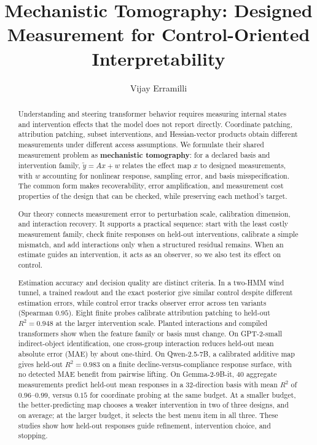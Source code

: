\documentclass[sigconf,10pt,nonacm,balance=false]{acmart}
\title[Mechanistic Tomography]{Mechanistic Tomography: Designed Measurement for Control-Oriented Interpretability}
\author{Vijay Erramilli}
\begin{document}
\begin{abstract}
Understanding and steering transformer behavior requires measuring internal states and intervention effects that the model does not report directly. Coordinate patching, attribution patching, subset interventions, and Hessian-vector products obtain different measurements under different access assumptions. We formulate their shared measurement problem as \textbf{mechanistic tomography}: for a declared basis and intervention family, $\widetilde y=Ax+w$ relates the effect map $x$ to designed measurements, with $w$ accounting for nonlinear response, sampling error, and basis misspecification. The common form makes recoverability, error amplification, and measurement cost properties of the design that can be checked, while preserving each method's target.

Our theory connects measurement error to perturbation scale, calibration dimension, and interaction recovery. It supports a practical sequence: start with the least costly measurement family, check finite responses on held-out interventions, calibrate a simple mismatch, and add interactions only when a structured residual remains. When an estimate guides an intervention, it acts as an observer, so we also test its effect on control.

Estimation accuracy and decision quality are distinct criteria. In a two-HMM wind tunnel, a trained readout and the exact posterior give similar control despite different estimation errors, while control error tracks observer error across ten variants (Spearman $0.95$). Eight finite probes calibrate attribution patching to held-out $R^2=0.948$ at the larger intervention scale. Planted interactions and compiled transformers show when the feature family or basis must change. On GPT-2-small indirect-object identification, one cross-group interaction reduces held-out mean absolute error (MAE) by about one-third. On Qwen-2.5-7B, a calibrated additive map gives held-out $R^2=0.983$ on a finite decline-versus-compliance response surface, with no detected MAE benefit from pairwise lifting. On Gemma-2-9B-it, 40 aggregate measurements predict held-out mean responses in a 32-direction basis with mean $R^2$ of $0.96$--$0.99$, versus $0.15$ for coordinate probing at the same budget. At a smaller budget, the better-predicting map chooses a weaker intervention in two of three designs, and on average; at the larger budget, it selects the best menu item in all three. These studies show how held-out responses guide refinement, intervention choice, and stopping.
\end{abstract}
\end{document}
